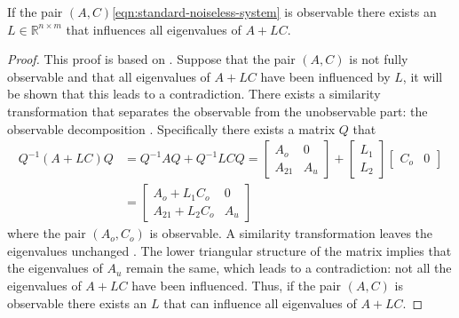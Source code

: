 \begin{theorem}
\label{th:arbitrary-alc-eigenvalues}
    If the pair $(A,C)$\eqref{eqn:standard-noiseless-system} is observable there exists an $L \in \mathbb{R}^{n \times m}$ that influences all eigenvalues of $A+LC$.
\end{theorem}
\begin{proof}
    This proof is based on \cite[Section 4.2]{Antsaklis2006LinearSystems}. Suppose that the pair $(A,C)$ is not fully observable and that all eigenvalues of $A+LC$  have been influenced by $L$, it will be shown that this leads to a contradiction. There exists a similarity transformation that separates the observable from the unobservable part: the observable decomposition \cite[Section 16.1]{Hespanha2018LinearTheory}. Specifically there exists a matrix $Q$ that
    \begin{equation*}
    \begin{split}
        Q^{-1}(A+LC)Q 
        &= Q^{-1}AQ + Q^{-1}LCQ =
        \begin{bmatrix}
            A_o & 0 \\
            A_{21} & A_u
        \end{bmatrix}
        + 
        \begin{bmatrix}
            L_1 \\
            L_2
        \end{bmatrix}
        \begin{bmatrix}
            C_o & 0
        \end{bmatrix} \\
        &=
        \begin{bmatrix}
            A_o + L_1 C_o & 0 \\
            A_{21} + L_2 C_o & A_u
        \end{bmatrix}
    \end{split}
\end{equation*}  
where the pair $(A_o,C_o)$ is observable. A similarity transformation leaves the eigenvalues unchanged \cite[Section 5.2]{Lay2016LinearApplications}. The lower triangular structure of the matrix implies that the eigenvalues of $A_u$ remain the same, which leads to a contradiction: not all the eigenvalues of $A+LC$ have been influenced. Thus, if the pair $(A,C)$ is observable there exists an $L$ that can influence all eigenvalues of $A+LC$.
\end{proof}

